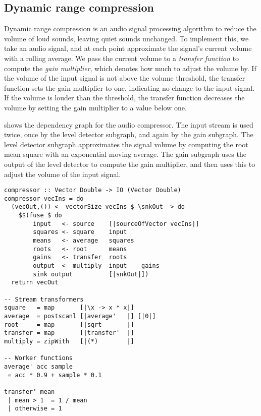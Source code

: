 
\subsection{Dynamic range compression}
Dynamic range compression is an audio signal processing algorithm to reduce the volume of loud sounds, leaving quiet sounds unchanged.
To implement this, we take an audio signal, and at each point approximate the signal's current volume with a rolling average.
We pass the current volume to a \emph{transfer function} to compute the \emph{gain multiplier}, which denotes how much to adjust the volume by.
If the volume of the input signal is not above the volume threshold, the transfer function sets the gain multiplier to one, indicating no change to the input signal.
If the volume is louder than the threshold, the transfer function decreases the volume by setting the gain multiplier to a value below one.

 shows the dependency graph for the audio compressor.
The input stream is used twice, once by the level detector subgraph, and again by the gain subgraph.
The level detector subgraph approximates the signal volume by computing the root mean square with an exponential moving average.
The gain subgraph uses the output of the level detector to compute the gain multiplier, and then uses this to adjust the volume of the input signal.

\begin{lstlisting}[float,label=l:bench:compressorFolderol,caption=Folderol implementation of \Hs/compressor/]
compressor :: Vector Double -> IO (Vector Double)
compressor vecIns = do
  (vecOut,()) <- vectorSize vecIns $ \snkOut -> do
    $$(fuse $ do
        input   <- source    [|sourceOfVector vecIns|]
        squares <- square    input
        means   <- average   squares
        roots   <- root      means
        gains   <- transfer  roots
        output  <- multiply  input    gains
        sink output          [|snkOut|])
  return vecOut

-- Stream transformers
square   = map       [|\x -> x * x|]
average  = postscanl [|average'   |] [|0|]
root     = map       [|sqrt       |]
transfer = map       [|transfer'  |]
multiply = zipWith   [|(*)        |]

-- Worker functions
average' acc sample
 = acc * 0.9 + sample * 0.1

transfer' mean
 | mean > 1  = 1 / mean
 | otherwise = 1
\end{lstlisting}

